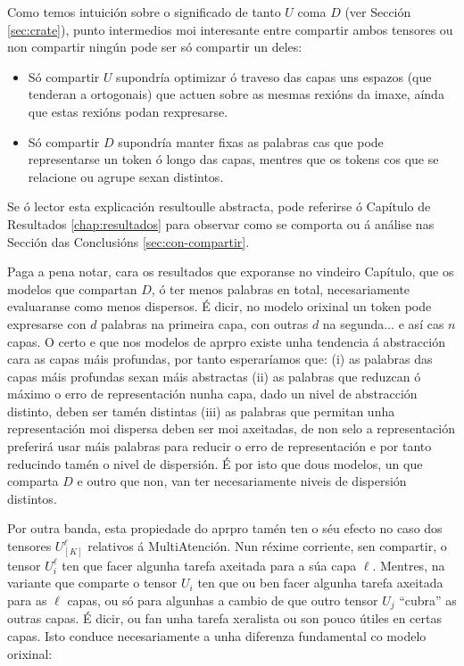 Como temos intuición sobre o significado de tanto $U$ coma $D$ (ver Sección \ref{sec:crate}), punto intermedios moi interesante entre compartir ambos tensores ou non compartir ningún pode ser só compartir un deles:
\begin{itemize}
				\item Só compartir $U$ supondría optimizar ó traveso das capas uns espazos (que tenderan a ortogonais) que actuen sobre as mesmas rexións da imaxe, aínda que estas rexións podan rexpresarse.
				\item Só compartir $D$ supondría manter fixas as palabras cas que pode representarse un \gls{token} ó longo das capas, mentres que os \glspl{token} cos que se relacione ou agrupe sexan distintos.
\end{itemize}

Se ó lector esta explicación resultoulle abstracta, pode referirse ó Capítulo de Resultados \ref{chap:resultados} para observar como se comporta ou á análise nas Sección das Conclusións \ref{sec:con-compartir}.

Paga a pena notar, cara os resultados que exporanse no vindeiro Capítulo, que os modelos que compartan $D$, ó ter menos palabras en total, necesariamente evaluaranse como menos dispersos. É dicir, no modelo orixinal un \gls{token} pode expresarse con $d$ palabras na primeira capa, con outras $d$ na segunda$\dots$ e así cas $n$ capas. O certo e que nos modelos de \acrshort{aprpro} existe unha tendencia á abstracción cara as capas máis profundas\cite{dlbook}, por tanto esperaríamos que: (i) as palabras das capas máis profundas sexan máis abstractas (ii) as palabras que reduzcan ó máximo o erro de representación nunha capa, dado un nivel de abstracción distinto, deben ser tamén distintas (iii) as palabras que permitan unha representación moi dispersa deben ser moi axeitadas, de non selo a representación preferirá usar máis palabras para reducir o erro de representación e por tanto reducindo tamén o nivel de dispersión. É por isto que dous modelos, un que comparta $D$ e outro que non, van ter necesariamente niveis de dispersión distintos.

Por outra banda, esta propiedade do \acrshort{aprpro} tamén ten o séu efecto no caso dos tensores $U_{[K]}^\ell$ relativos á MultiAtención. Nun réxime corriente, sen compartir, o tensor $U_i^\ell$ ten que facer algunha tarefa axeitada para a súa capa $\ell$. Mentres, na variante que comparte o tensor $U_i$ ten que ou ben facer algunha tarefa axeitada para as $\ell$ capas, ou só para algunhas a cambio de que outro tensor $U_j$ ``cubra'' as outras capas. É dicir, ou fan unha tarefa xeralista ou son pouco útiles en certas capas. Isto conduce necesariamente a unha diferenza fundamental co modelo orixinal:

